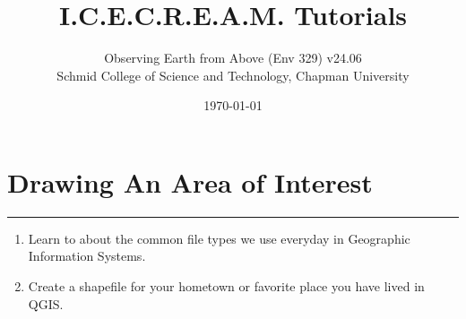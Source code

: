 \documentclass[oneside,a4paper,11pt,explicit]{book}
\title{I.C.E.C.R.E.A.M. Tutorials}
\subtitle{\small Observing Earth from Above (Env 329) v24.06  \\
	\small Schmid College of Science and Technology, Chapman University}
\date{\today}
\begin{document}
	
\dominitoc
	
\faketableofcontents
	
\setcounter{chapter}{2} %
	
\chapter{Drawing An Area of Interest} %
	
\vspace{-2em}
	
\minitoc
	
\hrule
	
\vspace{1em}
	
\begin{tcolorbox}[enhanced,frame style image=blueshade.png, opacityback=0.75,opacitybacktitle=0.25,colback=blue!5!white,colframe=blue!75!black,title={\Large \textbf{Objectives:}}]
	\large
	\begin{enumerate}
		\item Learn to about the common file types we use everyday in Geographic Information Systems.
		\item Create a shapefile for your hometown or favorite place you have lived in QGIS. 
	\end{enumerate}
\end{tcolorbox}
	
\clearpage
	
\end{document}
